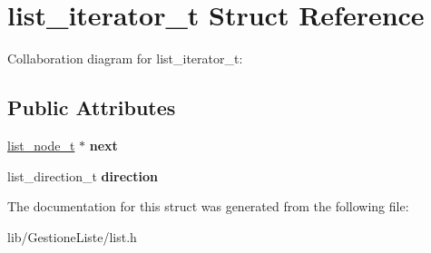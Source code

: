 \hypertarget{structlist__iterator__t}{}\section{list\+\_\+iterator\+\_\+t Struct Reference}
\label{structlist__iterator__t}


Collaboration diagram for list\+\_\+iterator\+\_\+t\+:
\subsection*{Public Attributes}
\begin{DoxyCompactItemize}
\item 
\mbox{\label{structlist__iterator__t_adfc911fa0f601936c4a58c95a08737ee}} 
\hyperlink{structlist__node}{list\+\_\+node\+\_\+t} $\ast$ {\bfseries next}
\item 
\mbox{\label{structlist__iterator__t_aa95ac6753d9a9e3671e4c21f3d05b32a}} 
list\+\_\+direction\+\_\+t {\bfseries direction}
\end{DoxyCompactItemize}


The documentation for this struct was generated from the following file\+:\begin{DoxyCompactItemize}
\item 
lib/\+Gestione\+Liste/list.\+h\end{DoxyCompactItemize}
